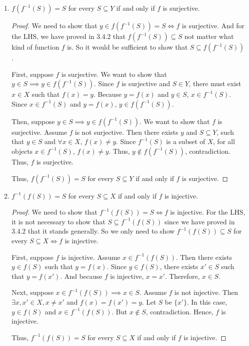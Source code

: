 \documentclass[12pt, letter]{article}
\begin{document}
\begin{enumerate}
    \item $f(f^{-1}(S))=S$ for every $S\subseteq Y$ if and only if $f$ is surjective. 
    \begin{proof}
        We need to show that $y\in f(f^{-1}(S))=S\iff f$ is surjective. And for the LHS, we have proved in 3.4.2 that $f(f^{-1}(S))\subseteq S$ not matter what kind of function $f$ is. So it would be sufficient to show that $S\subseteq f(f^{-1}(S))$. 
        
        First, suppose $f$ is surjective. We want to show that $y\in S\implies y\in f(f^{-1}(S))$. Since $f$ is surjective and $S\in Y$, there must exist $x\in X$ such that $f(x)=y$. Because $y=f(x)$ and $y\in S$, $x\in f^{-1}(S)$. Since $x\in f^{-1}(S)$ 
        and $y=f(x)$, $y\in f(f^{-1}(S))$. 

        Then, suppose $y\in S\implies y\in f(f^{-1}(S))$. We want to show that $f$ is surjective. Assume $f$ is not surjective. Then there exists $y$ and $S\subseteq Y$, such that $y\in S$ and $\forall x\in X$, $f(x)\ne y$. Since $f^{-1}(S)$ is a subset of $X$, 
        for all objects $x\in f^{-1}(S)$, $f(x)\ne y$. Thus, $y\notin f(f^{-1}(S))$, contradiction. Thus, $f$ is surjective.
        
        Thus, $f(f^{-1}(S))=S$ for every $S\subseteq Y$ if and only if $f$ is surjective. 
    \end{proof}
    \item $f^{-1}(f(S))=S$ for every $S\subseteq X$ if and only if $f$ is injective.
    \begin{proof}
        We need to show that $f^{-1}(f(S))=S\iff f$ is injective. For the LHS, it is not necessary to show that $S\subseteq f^{-1}(f(S))$ since we have proved in 3.4.2 that it stands generally. 
        So we only need to show $f^{-1}(f(S))\subseteq S$ for every $S\subseteq X\iff f$ is injective.
        
        First, suppose $f$ is injective. Assume $x\in f^{-1}(f(S))$. Then there exists $y\in f(S)$ such that $y=f(x)$. Since $y\in f(S)$, there exists $x'\in S$ such that $y=f(x')$. 
        And because $f$ is injective, $x=x'$. Therefore, $x\in S$.

        Next, suppose $x\in f^{-1}(f(S))\implies x\in S$. Assume $f$ is not injective. Then $\exists x,x'\in X, x\ne x'$ and $f(x)=f(x')=y$. 
        Let $S$ be $\{x'\}$. In this case, $y\in f(S)$ and $x\in f^{-1}(f(S))$. But $x\notin S$, contradiction. Hence, $f$ is injective.

        Thus, $f^{-1}(f(S))=S$ for every $S\subseteq X$ if and only if $f$ is injective.
    \end{proof}
\end{enumerate}
\end{document}
